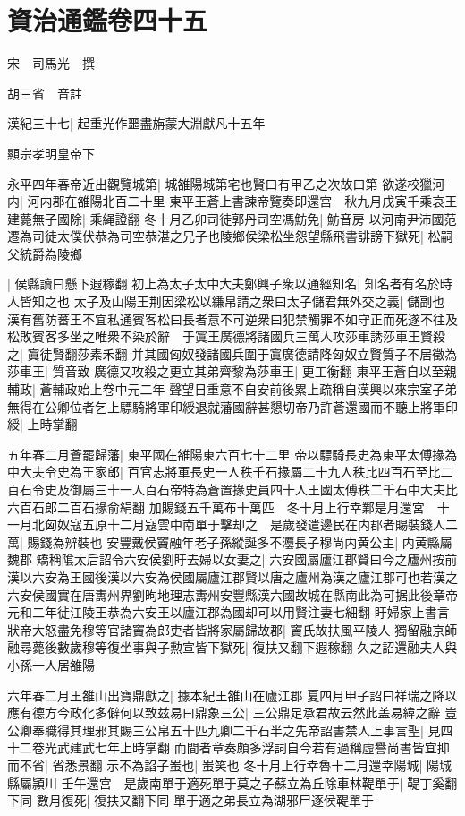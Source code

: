 \section{資治通鑑卷四十五}
宋　司馬光　撰

胡三省　音註

漢紀三十七|{
	起重光作噩盡旃蒙大淵獻凡十五年}


顯宗孝明皇帝下

永平四年春帝近出觀覽城第|{
	城雒陽城第宅也賢曰有甲乙之次故曰第}
欲遂校獵河内|{
	河内郡在雒陽北百二十里}
東平王蒼上書諫帝覽奏即還宫　秋九月戊寅千乘哀王建薨無子國除|{
	乘䋲證翻}
冬十月乙卯司徒郭丹司空馮魴免|{
	魴音房}
以河南尹沛國范遷為司徒太僕伏恭為司空恭湛之兄子也陵鄉侯梁松坐怨望縣飛書誹謗下獄死|{
	松嗣父統爵為陵鄉}


|{
	侯縣讀曰懸下遐稼翻}
初上為太子太中大夫鄭興子衆以通經知名|{
	知名者有名於時人皆知之也}
太子及山陽王荆因梁松以縑帛請之衆曰太子儲君無外交之義|{
	儲副也}
漢有舊防蕃王不宜私通賓客松曰長者意不可逆衆曰犯禁觸罪不如守正而死遂不往及松敗賓客多坐之唯衆不染於辭　于寘王廣德將諸國兵三萬人攻莎車誘莎車王賢殺之|{
	寘徒賢翻莎素禾翻}
并其國匈奴發諸國兵圍于寘廣德請降匈奴立賢質子不居徵為莎車王|{
	質音致}
廣德又攻殺之更立其弟齊黎為莎車王|{
	更工衡翻}
東平王蒼自以至親輔政|{
	蒼輔政始上卷中元二年}
聲望日重意不自安前後累上疏稱自漢興以來宗室子弟無得在公卿位者乞上驃騎將軍印綬退就藩國辭甚懇切帝乃許蒼還國而不聽上將軍印綬|{
	上時掌翻}


五年春二月蒼罷歸藩|{
	東平國在雒陽東六百七十二里}
帝以驃騎長史為東平太傅掾為中大夫令史為王家郎|{
	百官志將軍長史一人秩千石掾屬二十九人秩比四百石至比二百石令史及御屬三十一人百石帝特為蒼置掾史員四十人王國太傅秩二千石中大夫比六百石郎二百石掾俞絹翻}
加賜錢五千萬布十萬匹　冬十月上行幸鄴是月還宮　十一月北匈奴寇五原十二月寇雲中南單于擊却之　是歲發遣邊民在内郡者賜裝錢人二萬|{
	賜錢為辨裝也}
安豐戴侯竇融年老子孫縱誕多不灋長子穆尚内黄公主|{
	内黄縣屬魏郡}
矯稱隂太后詔令六安侯劉盱去婦以女妻之|{
	六安國屬廬江郡賢曰今之廬州按前漢以六安為王國後漢以六安為侯國屬廬江郡賢以唐之廬州為漢之廬江郡可也若漢之六安侯國實在唐夀州界劉昫地理志夀州安豐縣漢六國故城在縣南此為可据此後章帝元和二年徙江陵王恭為六安王以廬江郡為國却可以用賢注妻七細翻}
盱婦家上書言狀帝大怒盡免穆等官諸竇為郎吏者皆將家屬歸故郡|{
	竇氏故扶風平陵人}
獨留融京師融尋薨後數歲穆等復坐事與子勲宣皆下獄死|{
	復扶又翻下遐稼翻}
久之詔還融夫人與小孫一人居雒陽

六年春二月王雒山出寶鼎獻之|{
	據本紀王雒山在廬江郡}
夏四月甲子詔曰祥瑞之降以應有德方今政化多僻何以致兹易曰鼎象三公|{
	三公鼎足承君故云然此盖易緯之辭}
豈公卿奉職得其理邪其賜三公帛五十匹九卿二千石半之先帝詔書禁人上事言聖|{
	見四十二卷光武建武七年上時掌翻}
而間者章奏頗多浮詞自今若有過稱虛譽尚書皆宜抑而不省|{
	省悉景翻}
示不為諂子蚩也|{
	蚩笑也}
冬十月上行幸魯十二月還幸陽城|{
	陽城縣屬頴川}
壬午還宫　是歲南單于適死單于莫之子蘇立為丘除車林鞮單于|{
	鞮丁奚翻下同}
數月復死|{
	復扶又翻下同}
單于適之弟長立為湖邪尸逐侯鞮單于

